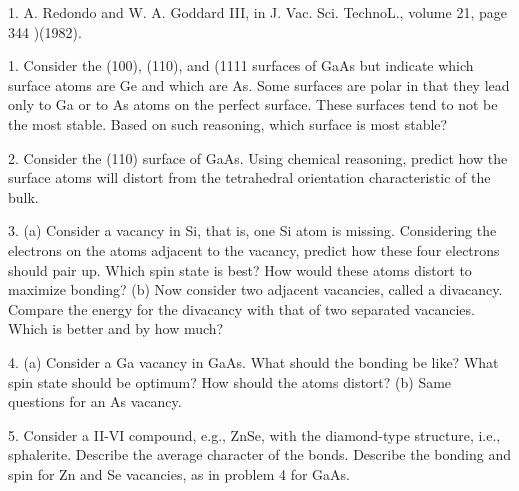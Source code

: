 \bigskip


\item {1.} A. Redondo and W. A. Goddard III, in J. Vac. Sci. TechnoL., 
volume 21, page 344 )(1982).

\bigskip


\item {1.} Consider the (100), (110), and (1111 surfaces of GaAs but indicate
which surface atoms are Ge and which are As. Some surfaces are
polar in that they lead only to Ga or to As atoms on the perfect 
surface. These surfaces tend to not be the most stable.  Based on such
reasoning, which surface is most stable?

\item {2.} Consider the (110) surface of GaAs. Using chemical reasoning, 
predict how the surface atoms will distort from the tetrahedral orientation 
characteristic of the bulk.

\item {3.}  (a) Consider a vacancy in Si, that is, one Si atom is missing. 
Considering the electrons on the atoms adjacent to the vacancy, predict 
how these four electrons should pair up.  Which spin state is best?  How 
would these atoms distort to maximize bonding?  (b) 
Now consider two adjacent vacancies, called a divacancy. Compare the 
energy for the divacancy with that of two separated vacancies.  Which is 
better and by how much?

\item {4.}  (a) Consider a Ga vacancy in GaAs.  What should the bonding 
be like?  What spin state should be optimum? How should the atoms distort?
(b) Same questions for an As vacancy.

\item {5.} Consider a II-VI compound, e.g., ZnSe, with the diamond-type 
structure, i.e., sphalerite. Describe the average character of the 
bonds.  Describe the bonding and spin for Zn and Se vacancies, as in 
problem 4 for GaAs.

\bigskip
